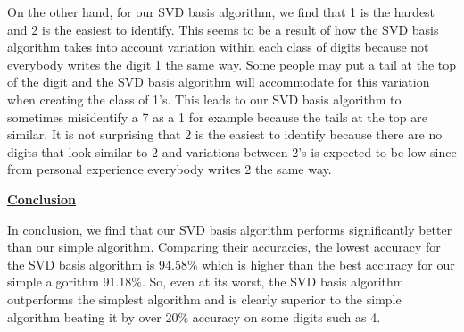 \documentclass[final,12pt,reqno]{amsart}
\begin{document}
On the other hand, for our SVD basis algorithm, we find that 1 is the hardest and 2 is the easiest to identify. This seems to be a result of how the SVD basis algorithm takes into account variation within each class of digits because not everybody writes the digit 1 the same way. Some people may put a tail at the top of the digit and the SVD basis algorithm will accommodate for this variation when creating the class of 1's. This leads to our SVD basis algorithm to sometimes misidentify a 7 as a 1 for example because the tails at the top are similar. It is not surprising that 2 is the easiest to identify because there are no digits that look similar to 2 and variations between 2's is expected to be low since from personal experience everybody writes 2 the same way.

\underline{\textbf{Conclusion}}

In conclusion, we find that our SVD basis algorithm performs significantly better than our simple algorithm. Comparing their accuracies, the lowest accuracy for the SVD basis algorithm is 94.58$\%$ which is higher than the best accuracy for our simple algorithm 91.18$\%$. So, even at its worst, the SVD basis algorithm outperforms the simplest algorithm and is clearly superior to the simple algorithm beating it by over 20$\%$ accuracy on some digits such as 4.
\end{document}
